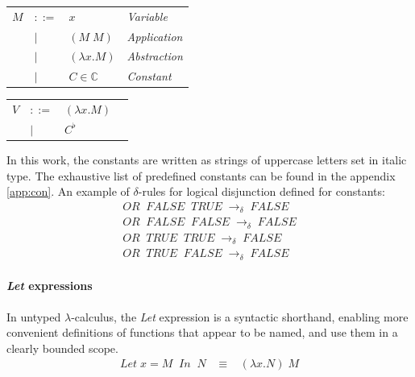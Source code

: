 \documentclass[table, a4paper, 10pt]{book}
\begin{document}
\vspace{3mm}
\begin{tabular}{llll}
$M$ &$::=$             &$x$                 & {\small\hspace{0.2cm}\textit{Variable}}\\
    &\hspace{0.1cm}$|$ &$(M\;M)$            & {\small\hspace{0.2cm}\textit{Application}}\\
    &\hspace{0.1cm}$|$ &$(\lambda x.M)$     & {\small\hspace{0.2cm}\textit{Abstraction}}\\
    &\hspace{0.1cm}$|$ &$C \in \mathbb{C}$  & {\small\hspace{0.2cm}\textit{Constant}}\\
\end{tabular}
\begin{tabular}{llll}
\hspace{11mm}$V$ &$::=$             &$(\lambda x.M)$     &\\
\hspace{11mm}    &\hspace{0.1cm}$|$ &$C^\flat$   &
\hspace{11mm}	\vspace{8.4mm}
\end{tabular}
\vspace{3mm}

\noindent
In this work, the constants are written as strings of uppercase letters set in italic type.
The exhaustive list of predefined constants can be found in the appendix \ref{app:con}.
An example of $\delta$-rules for logical disjunction defined for constants:
\begin{align*}
\mathit{OR}\;\;\mathit{FALSE}\;\;\mathit{TRUE}\;\to_\delta\;\mathit{FALSE}\\
\mathit{OR}\;\;\mathit{FALSE}\;\;\mathit{FALSE}\;\to_\delta\;\mathit{FALSE}\\
\mathit{OR}\;\;\mathit{TRUE}\;\;\mathit{TRUE}\;\to_\delta\;\mathit{FALSE}\\
\mathit{OR}\;\;\mathit{TRUE}\;\;\mathit{FALSE}\;\to_\delta\;\mathit{FALSE}
\end{align*}

\paragraph{\textit{Let} expressions}
In untyped $\lambda$-calculus, the \textit{Let} expression
is a syntactic shorthand, enabling more convenient
definitions of functions that appear to be named, and use them
in a clearly bounded scope. 
\begin{align*}
\mathit{Let}\;x = M\;\;\mathit{In}\;\;N \;\;\;\equiv\;\;\;(\lambda x.N)\;M
\end{align*}
\end{document}
